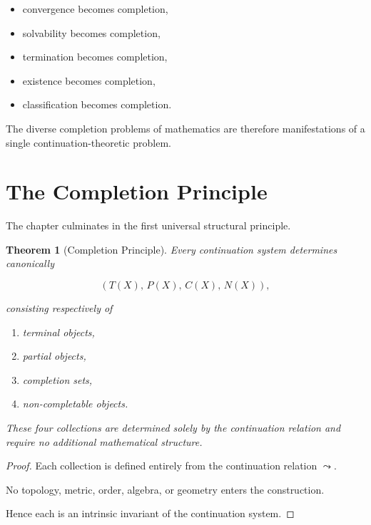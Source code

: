 \documentclass[13pt,openany]{book}
\theoremstyle{plain}
\newtheorem{theorem}{Theorem}[chapter]
\theoremstyle{definition}
\begin{document}
\begin{itemize}
\item convergence becomes completion,

\item solvability becomes completion,

\item termination becomes completion,

\item existence becomes completion,

\item classification becomes completion.
\end{itemize}

The diverse completion problems of mathematics are therefore manifestations of a
single continuation-theoretic problem.


\section{The Completion Principle}

The chapter culminates in the first universal structural principle.

\begin{theorem}[Completion Principle]
Every continuation system determines canonically

\[
(T(X),\,P(X),\,C(X),\,N(X)),
\]

consisting respectively of

\begin{enumerate}
\item terminal objects,

\item partial objects,

\item completion sets,

\item non-completable objects.
\end{enumerate}

These four collections are determined solely by the continuation relation and
require no additional mathematical structure.
\end{theorem}

\begin{proof}
Each collection is defined entirely from the continuation relation
$\leadsto$.

No topology,
metric,
order,
algebra,
or geometry enters the construction.

Hence each is an intrinsic invariant of the continuation system.
\end{proof}
\end{document}
